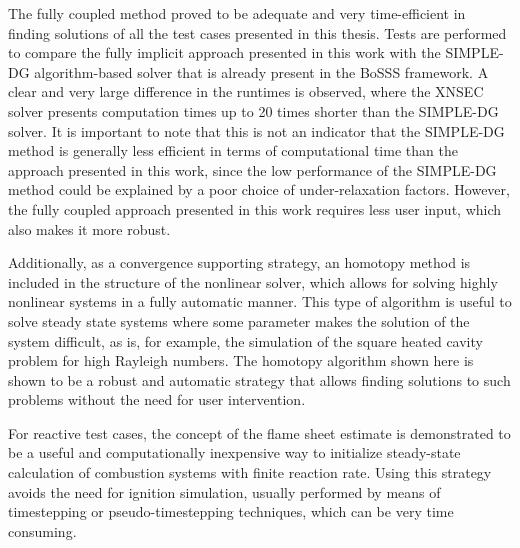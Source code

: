 The fully coupled method proved to be adequate and very time-efficient in finding solutions of all the test cases presented in this thesis. Tests are performed to compare the fully implicit approach presented in this work with the SIMPLE-DG algorithm-based solver that is already present in the BoSSS framework. A clear and very large difference in the runtimes is observed, where the XNSEC solver presents computation times up to 20 times shorter than the SIMPLE-DG solver. It is important to note that this is not an indicator that the SIMPLE-DG method is generally less efficient in terms of computational time than the approach presented in this work, since the low performance of the SIMPLE-DG method could be explained by a poor choice of under-relaxation factors. However, the fully coupled approach presented in this work requires less user input, which also makes it more robust.

Additionally, as a convergence supporting strategy, an homotopy method is included in the structure of the nonlinear solver, which allows for solving highly nonlinear systems in a fully automatic manner. This type of algorithm is useful to solve steady state systems where some parameter makes the solution of the system difficult, as is, for example, the simulation of the square heated cavity problem for high Rayleigh numbers. The homotopy algorithm shown here is shown to be a robust and automatic strategy that allows finding solutions to such problems without the need for user intervention.

For reactive test cases, the concept of the flame sheet estimate is demonstrated to be a useful and computationally inexpensive way to initialize steady-state calculation of combustion systems with finite reaction rate. Using this strategy avoids the need for ignition simulation, usually performed by means of timestepping or pseudo-timestepping techniques, which can be very time consuming.






